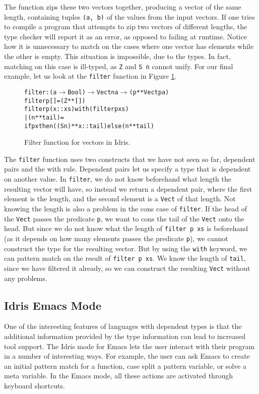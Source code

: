 The function zips these two vectors together, producing a vector of the same length, containing tuples \texttt{(a, b)} of the values from the input vectors. If one tries to compile a program that attempts to zip two vectors of different lengths, the type checker will report it as an error, as opposed to failing at runtime. Notice how it is unnecessary to match on the cases where one vector has elements while the other is empty. This situation is impossible, due to the types. In fact, matching on this case is ill-typed, as \texttt{Z} and \texttt{S~n} cannot unify. For our final example, let us look at the \texttt{filter} function in Figure \ref{fig:filter}.

\begin{figure}
\begin{alltt}
filter : (a \(\to\) Bool) \(\to\) Vect n a \(\to\) (p ** Vect p a)
filter p [] = (Z ** [])
filter p (x::xs) with (filter p xs)
  | (n ** tail) =
    if p x then ((S n) ** x::tail) else (n ** tail)
\end{alltt}
\caption{Filter function for vectors in Idris.}
\label{fig:filter}
\end{figure}

The \texttt{filter} function uses two constructs that we have not seen so far, dependent pairs and the with rule. Dependent pairs let us specify a type that is dependent on another value. In \texttt{filter}, we do not know beforehand what length the resulting vector will have, so instead we return a dependent pair, where the first element is the length, and the second element is a \texttt{Vect} of that length. Not knowing the length is also a problem in the cons case of \texttt{filter}. If the head of the \texttt{Vect} passes the predicate \texttt{p}, we want to cons the tail of the \texttt{Vect} onto the head. But since we do not know what the length of \texttt{filter p xs} is beforehand (as it depends on how many elements passes the predicate \texttt{p}), we cannot construct the type for the resulting vector. But by using the \texttt{with} keyword, we can pattern match on the result of \texttt{filter p xs}. We know the length of \texttt{tail}, since we have filtered it already, so we can construct the resulting \texttt{Vect} without any problems.

\subsection{Idris Emacs Mode}
One of the interesting features of languages with dependent types is that the additional information provided by the type information can lead to increased tool support.
The Idris mode for Emacs lets the user interact with their program in a number of interesting ways.
For example, the user can ask Emacs to create an initial pattern match for a function, case split a pattern variable, or solve a meta variable.
In the Emacs mode, all these actions are activated through keyboard shortcuts.

